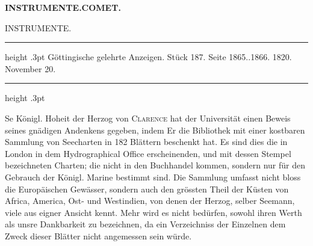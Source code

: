 \clearpage
\begingroup
\pagestyle{empty}
\thispagestyle{empty}
\noindent{}%
\makebox[12mm][l]{}%
\parbox[t]{\dimexpr\linewidth-24mm\relax}{\centering\footnotesize\bfseries INSTRUMENTE.\enspace COMET.\par}%
\par\nobreak\medskip
{}
\begin{center}
{\large INSTRUMENTE.}
\end{center}

\begin{center}\parbox{.86\linewidth}{\centering\small
\hrule height .3pt\relax\vspace{2.5pt}
Göttingische gelehrte Anzeigen. Stück 187. Seite 1865..1866. 1820. November 20.\par
\vspace{2.5pt}\hrule height .3pt\relax
}\end{center}

Se Königl. Hoheit der Herzog von \textsc{Clarence} hat der Universität einen Beweis
seines gnädigen Andenkens gegeben, indem Er die Bibliothek mit einer kostbaren Sammlung
von Seecharten in 182 Blättern beschenkt hat. Es sind dies die in London in dem
Hydrographical Office erscheinenden, und mit dessen Stempel bezeichneten Charten; die
nicht in den Buchhandel kommen, sondern nur für den Gebrauch der Königl. Marine bestimmt
sind. Die Sammlung umfasst nicht bloss die Europäischen Gewässer, sondern auch den
grössten Theil der Küsten von Africa, America, Ost- und Westindien, von denen der
Herzog, selber Seemann, viele aus eigner Ansicht kennt. Mehr wird es nicht bedürfen,
sowohl ihren Werth als unsre Dankbarkeit zu bezeichnen, da ein Verzeichniss der
Einzelnen dem Zweck dieser Blätter nicht angemessen sein würde.

